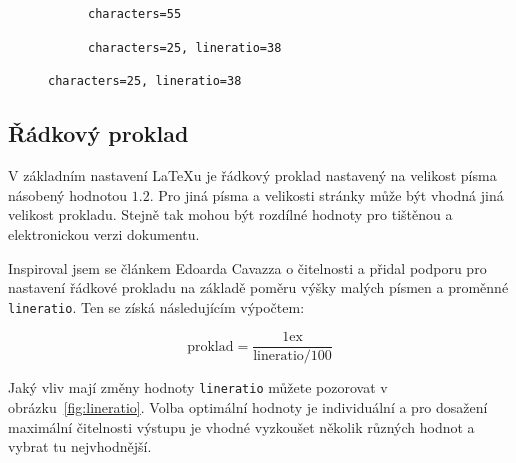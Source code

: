 \documentclass{csbulletin}
\begin{document}
\begin{figure}[tbp]
  \caption{Rozdíl velikosti písma v závislosti na počtu znaků}
  \label{fig:fontsize}
  \begin{subfigure}[t]{0.45\textwidth}
\caption{\texttt{characters=55}}
\end{subfigure}
\hfill
\begin{subfigure}[t]{0.45\textwidth}
\caption{\texttt{characters=25, lineratio=38}}
\end{subfigure}
\end{figure}

\subsection{Řádkový proklad}

V základním nastavení \LaTeX u je řádkový proklad nastavený
na velikost písma násobený hodnotou $1.2$. Pro jiná 
písma a velikosti stránky může být vhodná jiná velikost prokladu.
Stejně tak mohou být rozdílné hodnoty pro tištěnou a elektronickou 
verzi dokumentu. 

Inspiroval jsem se článkem Edoarda Cavazza \cite{cavazza} o čitelnosti
a přidal podporu pro nastavení řádkové prokladu na základě poměru výšky 
malých písmen a proměnné \texttt{lineratio}. Ten se získá následujícím 
výpočtem: 

\[\text{proklad} = \frac{1\text{ex}}{\text{lineratio}/ 100}\]

Jaký vliv mají změny hodnoty \texttt{lineratio} můžete pozorovat v obrázku~\ref{fig:lineratio}. 
Volba optimální hodnoty je individuální a pro dosažení maximální čitelnosti
výstupu je vhodné vyzkoušet několik různých hodnot a vybrat tu nejvhodnější.
\end{document}
